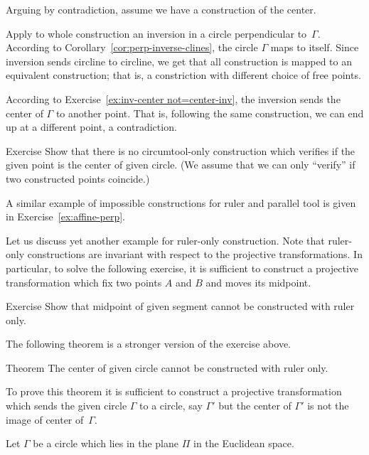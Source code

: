 \label{page:solution-for-ex:circumtool}
Arguing by contradiction, 
assume we have a construction of the center. 

Apply to whole construction an inversion in a circle perpendicular to~$\Gamma$.
According to Corollary~\ref{cor:perp-inverse-clines},
the circle
$\Gamma$ maps to itself.
Since inversion sends circline to circline, we get that all construction is mapped to an equivalent construction; 
that is, a constriction with different choice of free points.

According to Exercise~\ref{ex:inv-center not=center-inv}, 
the inversion sends the center of $\Gamma$ to another point.
That is, following the same construction, we can end up at a different point, a contradiction.
\qeds

\begin{thm}{Exercise}\label{ex:center-verify}
Show that there is no circumtool-only construction which verifies if the given point is the center of given circle.
(We assume that we can only ``verify'' if two constructed points coincide.) 
\end{thm}

A similar example of impossible constructions for ruler and parallel tool
 is given in Exercise~\ref{ex:affine-perp}.
 
Let us discuss yet another example for ruler-only construction.
Note that ruler-only constructions are invariant with respect to the projective transformations. 
In particular, to solve the following exercise, it is sufficient to construct a projective transformation which fix two points $A$ and $B$ and moves its midpoint.

\begin{thm}{Exercise}\label{ex:midpoint-proj}
Show that  midpoint of given segment cannot be constructed with ruler only.
\end{thm}

The following theorem is a stronger version of the exercise above.

\begin{thm}{Theorem}\label{thm:circle-center-proj}
The center of given circle cannot be constructed with ruler only.
\end{thm}

To prove this theorem 
it is sufficient to construct a projective transformation 
which sends the given circle $\Gamma$ to a circle, say $\Gamma'$ but the center of $\Gamma'$ is not the image of center of~$\Gamma$.

Let $\Gamma$ be a circle which lies in the plane $\Pi$ in the Euclidean space.

